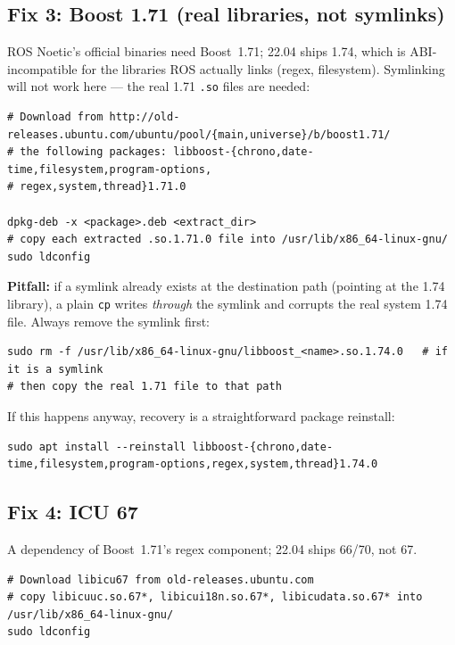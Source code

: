 \documentclass[11pt]{report}
\begin{document}
\subsection{Fix 3: Boost 1.71 (real libraries, not symlinks)}

ROS Noetic's official binaries need Boost~1.71; 22.04 ships 1.74, which is
ABI-incompatible for the libraries ROS actually links (regex, filesystem).
Symlinking will not work here --- the real 1.71 \texttt{.so} files are
needed:

\begin{lstlisting}[style=shell]
# Download from http://old-releases.ubuntu.com/ubuntu/pool/{main,universe}/b/boost1.71/
# the following packages: libboost-{chrono,date-time,filesystem,program-options,
# regex,system,thread}1.71.0

dpkg-deb -x <package>.deb <extract_dir>
# copy each extracted .so.1.71.0 file into /usr/lib/x86_64-linux-gnu/
sudo ldconfig
\end{lstlisting}

\textbf{Pitfall:} if a symlink already exists at the destination path
(pointing at the 1.74 library), a plain \texttt{cp} writes \emph{through}
the symlink and corrupts the real system 1.74 file. Always remove the
symlink first:

\begin{lstlisting}[style=shell]
sudo rm -f /usr/lib/x86_64-linux-gnu/libboost_<name>.so.1.74.0   # if it is a symlink
# then copy the real 1.71 file to that path
\end{lstlisting}

If this happens anyway, recovery is a straightforward package reinstall:

\begin{lstlisting}[style=shell]
sudo apt install --reinstall libboost-{chrono,date-time,filesystem,program-options,regex,system,thread}1.74.0
\end{lstlisting}

\subsection{Fix 4: ICU 67}

A dependency of Boost~1.71's regex component; 22.04 ships 66/70, not 67.

\begin{lstlisting}[style=shell]
# Download libicu67 from old-releases.ubuntu.com
# copy libicuuc.so.67*, libicui18n.so.67*, libicudata.so.67* into /usr/lib/x86_64-linux-gnu/
sudo ldconfig
\end{lstlisting}
\end{document}
